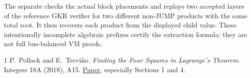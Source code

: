 \documentclass[11pt]{article}
\begin{document}
The separate  checks the actual block placements and replays two accepted layers of the reference GKR verifier for two different non-JUMP products with the same total root. It then recovers each product from the displayed child value. These intentionally incomplete algebraic prefixes certify the extraction formula; they are not full bus-balanced VM proofs.

\begin{thebibliography}{1}
 P.~Pollack and E.~Trevi\~no. \emph{Finding the Four Squares in Lagrange's Theorem}. Integers 18A (2018), A15. \href{https://math.colgate.edu/~integers/sjs15/sjs15.pdf}{Paper}, especially Sections 1 and 4.
\end{thebibliography}
\end{document}
